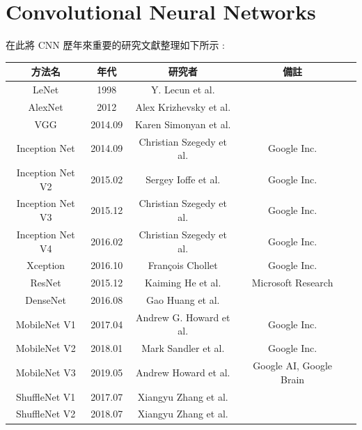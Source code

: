 \documentclass[11pt,UTF8]{ctexart}
\begin{document}
\newpage

\section{Convolutional Neural Networks}

在此將 CNN 歷年來重要的研究文獻整理如下所示 : 

\begin{center}
\begin{tabular}{ccccc}
\hline
方法名 & 年代 & 研究者 & 備註 \\
\hline
LeNet & 1998 & Y. Lecun et al. &  \\
AlexNet & 2012 & Alex Krizhevsky et al. &  \\
VGG & 2014.09 & Karen Simonyan et al. &  \\
Inception Net & 2014.09 & Christian Szegedy et al. & Google Inc. \\
Inception Net V2 & 2015.02 & Sergey Ioffe et al. & Google Inc. \\
Inception Net V3 & 2015.12 & Christian Szegedy et al. & Google Inc. \\
Inception Net V4 & 2016.02 & Christian Szegedy et al. & Google Inc. \\
Xception & 2016.10 & François Chollet & Google Inc. \\
ResNet & 2015.12 & Kaiming He et al. & Microsoft Research \\
DenseNet & 2016.08 & Gao Huang et al. &  \\
MobileNet V1 & 2017.04 & Andrew G. Howard et al. & Google Inc. \\
MobileNet V2 & 2018.01 & Mark Sandler et al. & Google Inc. \\
MobileNet V3 & 2019.05 & Andrew Howard et al. & Google AI, Google Brain \\
ShuffleNet V1 & 2017.07 & Xiangyu Zhang et al. & \\
ShuffleNet V2 & 2018.07 & Xiangyu Zhang et al.  & \\
\hline
\end{tabular}
\end{center}
\end{document}
